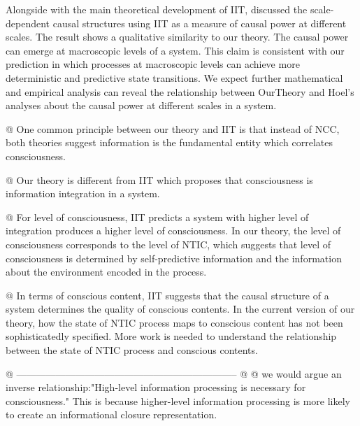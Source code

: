 \documentclass[utf8]{article}
\begin{document}
		Alongside with the main theoretical development of IIT, \cite{hoel2016can,hoel2013quantifying} discussed the scale-dependent causal structures using IIT as a measure of causal power at different scales. The result shows a qualitative similarity to our theory. The causal power can emerge at macroscopic levels of a system. This claim is consistent with our prediction in which processes at macroscopic levels can achieve more deterministic and predictive state transitions. We expect further mathematical and empirical analysis can reveal the relationship between \ac{OurTheory} and Hoel's analyses about the causal power at different scales in a system.  
		
		\begin{WritingMaterials}
			
			@ One common principle between our theory and IIT is that instead of NCC, both theories suggest information is the fundamental entity which correlates consciousness. 
			
			@ Our theory is different from IIT which proposes that consciousness is information integration in a system.
			
			@ For level of consciousness, IIT predicts a system with higher level of integration produces a higher level of consciousness. In our theory, the level of consciousness corresponds to the level of NTIC, which suggests that level of consciousness is determined by self-predictive information and the information about the environment encoded in the process.
			
			@ In terms of conscious content, IIT suggests that the causal structure of a system determines the quality of conscious contents. In the current version of our theory, how the state of NTIC process maps to conscious content has not been sophisticatedly specified. More work is needed to understand the relationship between the state of NTIC process and conscious contents.
		
		    @ --------------------------------------------------------------------
			@ \cite{Mudrik_Faivre_Koch}
			@ \cite{Mudrik_Faivre_Koch} we would argue an inverse relationship:"High-level information processing is necessary for consciousness." This is because higher-level information processing is more likely to create an informational closure representation.


\end{WritingMaterials}
\end{document}
